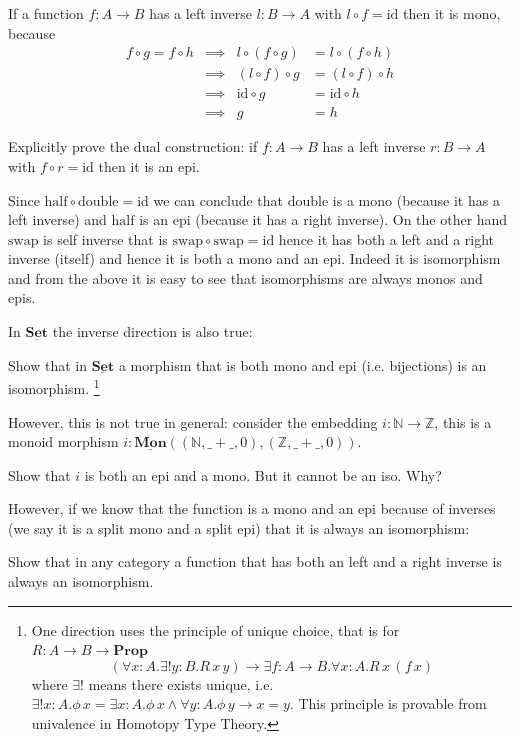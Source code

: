 \documentclass{article}
\newcommand{\Prop}{\mathbf{Prop}}
\newcommand{\Set}{\mathbf{Set}}
\newcommand{\cat}[1]{\underline{\mathbf{#1}}}
\newcommand{\id}{\mathrm{id}}
\newcommand{\Nat}{\mathbb{N}}
\newcommand{\Int}{\mathbb{Z}}
\newcommand{\half}{\mathrm{half}}
\newcommand{\double}{\mathrm{double}}
\newcommand{\swap}{\mathrm{swap}}
\begin{document}
If a function $f : A \to B$ has a left inverse $l : B \to A$ with $l \circ f = \id$ then it is mono, because  
\begin{align*}
f \circ g = f \circ h 
& \implies & l \circ (f \circ g) & = l \circ (f \circ h) \\
& \implies & (l \circ f) \circ g& = (l \circ f) \circ h \\
& \implies &\id \circ g & = \id \circ h \\
& \implies & g & = h 
\end{align*}
\begin{Exercise}
  Explicitly prove the dual construction: if $f : A \to B$ has a left inverse $r : B \to A$ with $f \circ r = \id$ then it is an epi.
\end{Exercise}
Since $\half \circ \double = \id$ we can conclude that $\double$ is a mono (because it has a left inverse) and $\half$ is an epi (because it has a right inverse). On the other hand $\swap$ is self inverse that is $\swap \circ \swap = \id$ hence it has both a left and a right inverse (itself) and hence it is both a mono and an epi. 
 Indeed it is isomorphism and from the above it is easy to see that isomorphisms are always monos and epis. 

In $\cat{\Set}$ the inverse direction is also true: 
\begin{Exercise}
  Show that in $\cat{\Set}$ a morphism that is both mono and epi (i.e. bijections) is an isomorphism.
\footnote{One direction uses the principle of unique choice, that is for $R : A \to B \to \Prop$~
\[(\forall x:A.\exists! y:B .R\,x\,y) \to \exists f :A \to B . \forall x:A.R\,x\,(f\,x) \]
where $\exists!$ means there exists unique, i.e. $\exists! x:A.\phi\,x = \exists x:A.\phi\,x \wedge \forall y:A.\phi\,y \to x=y$. This principle is provable from univalence in Homotopy Type Theory.} 
\end{Exercise}
However, this is not true in general: consider the embedding $i : \Nat \to \Int$, this is a monoid morphism $i : \cat{Mon}((\Nat,\_+\_,0),(\Int,\_+\_,0))$. 
\begin{Exercise}
  Show that $i$ is both an epi and a mono. But it cannot be an iso. Why?
\end{Exercise}
However, if we know that the function is a mono and an epi because of inverses (we say it is a split mono and a split epi) that it is always an isomorphism:
\begin{Exercise}
  Show that in any category a function that has both an left and a right inverse is always an isomorphism.
\end{Exercise}
\end{document}

